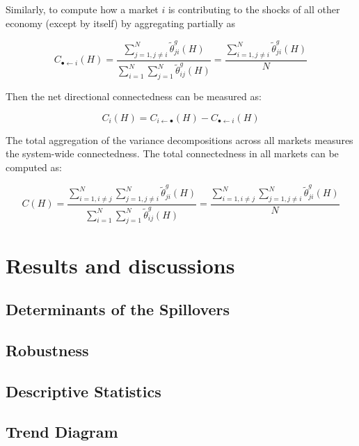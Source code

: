 \documentclass[]{elsarticle} %
\begin{document}
Similarly, to compute how a market \(i\) is contributing to the shocks
of all other economy (except by itself) by aggregating partially as

\[{{C}_{\bullet \leftarrow i}}\left( H \right)=\frac{\sum\nolimits_{j=1,j\ne i}^{N}{\tilde{\theta }_{ji}^{g}\left( H \right)}}{\sum\nolimits_{i=1}^{N}{\sum\nolimits_{j=1}^{N}{\tilde{\theta }_{ij}^{g}\left( H \right)}}}=\frac{\sum\nolimits_{i=1,j\ne i}^{N}{\tilde{\theta }_{ji}^{g}\left( H \right)}}{N}\]

Then the net directional connectedness can be measured as:

\[{{C}_{i}}\left( H \right)={{C}_{i\leftarrow \bullet }}\left( H \right)-{{C}_{\bullet \leftarrow i}}\left( H \right)\]

The total aggregation of the variance decompositions across all markets
measures the system-wide connectedness. The total connectedness in all
markets can be computed as:

\[C\left( H \right)=\frac{\sum\nolimits_{i=1,i\ne j}^{N}{\sum\nolimits_{j=1,j\ne i}^{N}{\tilde{\theta }_{ji}^{g}\left( H \right)}}}{\sum\nolimits_{i=1}^{N}{\sum\nolimits_{j=1}^{N}{\tilde{\theta }_{ij}^{g}\left( H \right)}}}=\frac{\sum\nolimits_{i=1,i\ne j}^{N}{\sum\nolimits_{j=1,j\ne i}^{N}{\tilde{\theta }_{ji}^{g}\left( H \right)}}}{N}\]

\section{Results and discussions}\label{results-and-discussions}

\subsection{Determinants of the
Spillovers}\label{determinants-of-the-spillovers}

\subsection{Robustness}\label{robustness}

\subsection{Descriptive Statistics}\label{descriptive-statistics}

\subsection{Trend Diagram}\label{trend-diagram}
\end{document}
